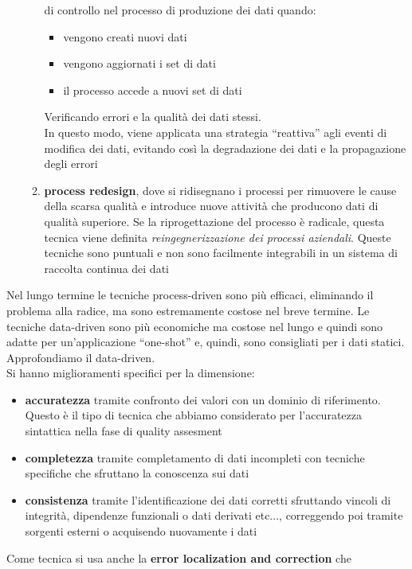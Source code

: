 \documentclass[a4paper,12pt, oneside]{book}
\begin{document}
\begin{enumerate}
\begin{enumerate}
    di controllo nel processo di produzione dei dati quando:
    \begin{itemize}
      \item vengono creati nuovi dati
      \item vengono aggiornati i set di dati 
      \item il processo accede a nuovi set di dati
    \end{itemize}
    Verificando errori e la qualità dei dati stessi.\\
    In questo modo, viene applicata una strategia ``reattiva'' agli eventi di
    modifica dei dati, evitando così la degradazione dei dati e la propagazione
    degli errori
    \item \textbf{process redesign}, dove si ridisegnano i processi per
    rimuovere le cause della scarsa qualità e introduce nuove attività che
    producono dati di qualità superiore. Se la riprogettazione del processo è
    radicale, questa tecnica viene definita \textit{reingegnerizzazione dei
      processi aziendali}. Queste tecniche sono puntuali e non sono facilmente
    integrabili in un sistema di raccolta continua dei dati
  \end{enumerate}
\end{enumerate}
Nel lungo termine le tecniche process-driven sono più efficaci, eliminando il
problema alla radice, ma sono estremamente costose nel breve termine. Le
tecniche data-driven sono più economiche ma costose nel lungo e quindi sono
adatte per un'applicazione ``one-shot'' e, quindi, sono consigliati per i dati
statici. \\
Approfondiamo il data-driven.\\
Si hanno miglioramenti specifici per la dimensione:
\begin{itemize}
  \item \textbf{accuratezza} tramite confronto dei valori con un dominio di
  riferimento. Questo è il tipo di tecnica che abbiamo considerato
  per l'accuratezza sintattica nella fase di quality assesment
  \item \textbf{completezza} tramite completamento di dati incompleti con
  tecniche specifiche che sfruttano la conoscenza sui dati 
  \item \textbf{consistenza} tramite l'identificazione dei dati corretti
  sfruttando vincoli di integrità, dipendenze funzionali o dati derivati
  etc$\ldots$, correggendo poi tramite sorgenti esterni o acquisendo nuovamente
  i dati
\end{itemize}
Come tecnica si usa anche la \textbf{error localization and correction} che
\end{document}
